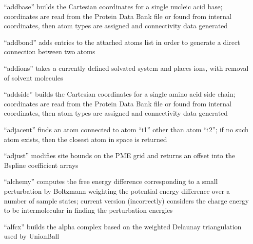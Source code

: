 \documentclass[letterpaper,11pt,english]{sphinxmanual}
\begin{document}
\sphinxAtStartPar
{}

\sphinxAtStartPar
“addbase” builds the Cartesian coordinates for a single nucleic acid base; coordinates are read from the Protein Data Bank file or found from internal coordinates, then atom types are assigned and connectivity data generated

\sphinxAtStartPar
{}

\sphinxAtStartPar
“addbond” adds entries to the attached atoms list in order to generate a direct connection between two atoms

\sphinxAtStartPar
{}

\sphinxAtStartPar
“addions” takes a currently defined solvated system and places ions, with removal of solvent molecules

\sphinxAtStartPar
{}

\sphinxAtStartPar
“addside” builds the Cartesian coordinates for a single amino acid side chain; coordinates are read from the Protein Data Bank file or found from internal coordinates, then atom types are assigned and connectivity data generated

\sphinxAtStartPar
{}

\sphinxAtStartPar
“adjacent” finds an atom connected to atom “i1” other than atom “i2”; if no such atom exists, then the closest atom in space is returned

\sphinxAtStartPar
{}

\sphinxAtStartPar
“adjust” modifies site bounds on the PME grid and returns an offset into the B\sphinxhyphen{}spline coefficient arrays

\sphinxAtStartPar
{}

\sphinxAtStartPar
“alchemy” computes the free energy difference corresponding to a small perturbation by Boltzmann weighting the potential energy difference over a number of sample states; current version (incorrectly) considers the charge energy to be intermolecular in finding the perturbation energies

\sphinxAtStartPar
{}

\sphinxAtStartPar
“alfcx” builds the alpha complex based on the weighted Delaunay triangulation used by UnionBall

\sphinxAtStartPar
{}
\end{document}
